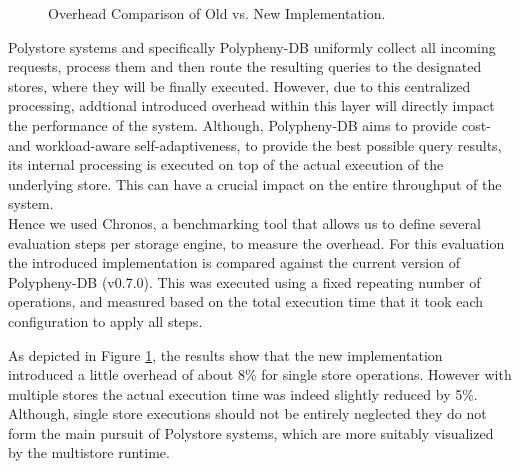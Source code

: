 \begin{figure}[t] 
    \centering 
\caption{Overhead Comparison of Old vs. New Implementation.}
\label{fig:overhead}
\end{figure}

Polystore systems and specifically Polypheny-DB uniformly collect all incoming requests, process them and then
route the resulting queries to the designated stores, where they will be finally executed. 
However, due to this centralized processing, addtional introduced overhead within this layer will directly impact the performance of the system.
Although, Polypheny-DB aims to provide cost- and workload-aware self-adaptiveness, to provide the best possible query results,
its internal processing is executed on top of the actual execution of the underlying store.
This can have a crucial impact on the entire throughput of the system.\\
Hence we used Chronos, a benchmarking tool that allows us to define several evaluation steps per storage engine,
to measure the overhead. For this evaluation the introduced implementation is compared against the current version of Polypheny-DB (v0.7.0).
This was executed using a fixed repeating number of operations, and measured based on the total execution time that it took each configuration
to apply all steps.


As depicted in Figure \ref{fig:overhead}, the results show that the new implementation introduced a little overhead of about 8\% for single store operations.
However with multiple stores the actual execution time was indeed slightly reduced by 5\%. 
Although, single store executions should not be entirely neglected
they do not form the main pursuit of Polystore systems, which are more suitably visualized by the multistore runtime.





